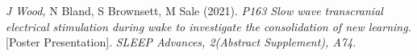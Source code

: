 \item
	\textit{J Wood, }N Bland, S Brownsett, M Sale (2021). 
	\textit{P163 Slow wave transcranial electrical stimulation during wake to investigate the consolidation of new learning.} [Poster Presentation]. 
	\textit{SLEEP Advances, 2(Abstract Supplement), A74.}

